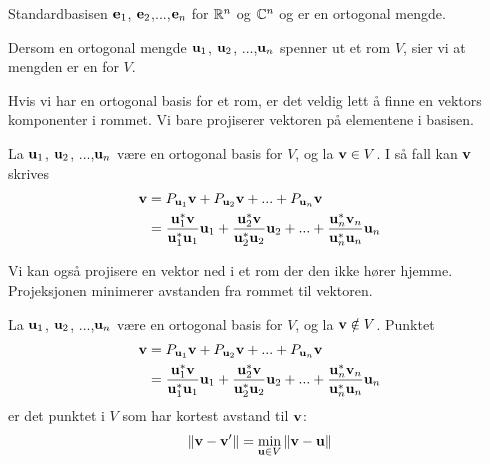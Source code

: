 \begin{ex}
Standardbasisen $\mathbf{e}_1$, $\mathbf{e}_2$,...,$\mathbf{e}_n$ for $\mathbb{R}^n$ og $\mathbb{C}^n$ og  er en ortogonal mengde.
\end{ex}

\begin{defnx}
Dersom en ortogonal mengde $\mathbf{u}_1$, $\mathbf{u} _2$, ...,$\mathbf{u}_n$ spenner ut et rom $V$, sier vi at mengden er en  for $V$.
\end{defnx}

%
%

Hvis vi har en ortogonal basis for et rom, er det veldig lett å finne en vektors komponenter i rommet. Vi bare projiserer vektoren på elementene i basisen. 
\begin{thm}
La $\mathbf{u}_1$, $\mathbf{u} _2$, ...,$\mathbf{u}_n$ være en ortogonal basis for $V$, og la $\mathbf{v} \in V$. I så fall kan $\mathbf{v}$ skrives
\begin{align*}
\mathbf{v}&= P_{\mathbf{u}_1} \mathbf{v} + P_{\mathbf{u}_2} \mathbf{v} + ... +P_{\mathbf{u}_n} \mathbf{v}\\ &= \frac{\mathbf{u}_1^*\mathbf{v}}{\mathbf{u}_1^*\mathbf{u}_1}\mathbf{u}_1 + \frac{\mathbf{u}_2^*\mathbf{v}}{\mathbf{u}_2^*\mathbf{u}_2}\mathbf{u}_2+...+\frac{\mathbf{u}_n^*\mathbf{v}_n}{\mathbf{u}_n^*\mathbf{u}_n}\mathbf{u}_n
\end{align*}
\end{thm}

\noindent Vi kan også projisere en vektor ned i et rom der den ikke hører hjemme. Projeksjonen minimerer avstanden fra rommet til vektoren.
\begin{thm}
La $\mathbf{u}_1$, $\mathbf{u} _2$, ...,$\mathbf{u}_n$ være en ortogonal basis for $V$, og la $\mathbf{v} \notin V$. Punktet
\begin{align*}
\mathbf{v}&= P_{\mathbf{u}_1} \mathbf{v} + P_{\mathbf{u}_2} \mathbf{v} + ... +P_{\mathbf{u}_n} \mathbf{v}\\ &= \frac{\mathbf{u}_1^*\mathbf{v}}{\mathbf{u}_1^*\mathbf{u}_1}\mathbf{u}_1 + \frac{\mathbf{u}_2^*\mathbf{v}}{\mathbf{u}_2^*\mathbf{u}_2}\mathbf{u}_2+...+\frac{\mathbf{u}_n^*\mathbf{v}_n}{\mathbf{u}_n^*\mathbf{u}_n}\mathbf{u}_n
\end{align*}
er det punktet i $V$ som har kortest avstand til $\mathbf{v}$:
\[
\|\mathbf{v}-\mathbf{v}' \|=\min_{\mathbf{u} \in V} \|\mathbf{v}-\mathbf{u} \|
\]
\end{thm}





